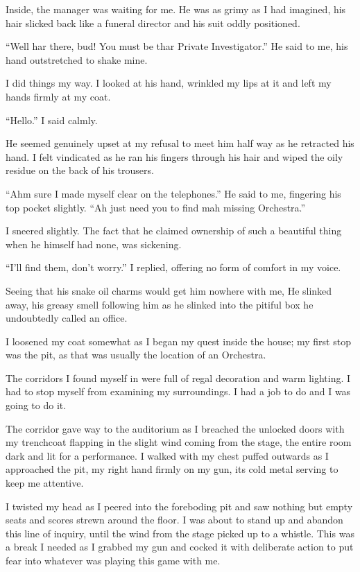 Inside, the manager was waiting for me. He was as grimy as I had
imagined, his hair slicked back like a funeral director and his
suit oddly positioned.

``Well har there, bud! You must be thar Private
Investigator.'' He said to me, his hand outstretched to shake
mine.

I did things my way. I looked at his hand, wrinkled my lips at it
and left my hands firmly at my coat.

``Hello.'' I said calmly.

He seemed genuinely upset at my refusal to meet him half way as he
retracted his hand. I felt vindicated as he ran his fingers through
his hair and wiped the oily residue on the back of his
trousers.

``Ahm sure I made myself clear on the telephones.'' He
said to me, fingering his top pocket slightly. ``Ah just need
you to find mah missing Orchestra.''

I sneered slightly. The fact that he claimed ownership of such a
beautiful thing when he himself had none, was sickening.

``I'll find them, don't worry.'' I replied,
offering no form of comfort in my voice.

Seeing that his snake oil charms would get him nowhere with me, He
slinked away, his greasy smell following him as he slinked into the
pitiful box he undoubtedly called an office.



I loosened my coat somewhat as I began my quest inside the house;
my first stop was the pit, as that was usually the location of an
Orchestra.

The corridors I found myself in were full of regal decoration and
warm lighting. I had to stop myself from examining my surroundings.
I had a job to do and I was going to do it.



The corridor gave way to the auditorium as I breached the unlocked
doors with my trenchcoat flapping in the slight wind coming from
the stage, the entire room dark and lit for a performance. I walked
with my chest puffed outwards as I approached the pit, my right
hand firmly on my gun, its cold metal serving to keep me
attentive.

I twisted my head as I peered into the foreboding pit and saw
nothing but empty seats and scores strewn around the floor. I was
about to stand up and abandon this line of inquiry, until the wind
from the stage picked up to a whistle. This was a break I needed as
I grabbed my gun and cocked it with deliberate action to put fear
into whatever was playing this game with me.

